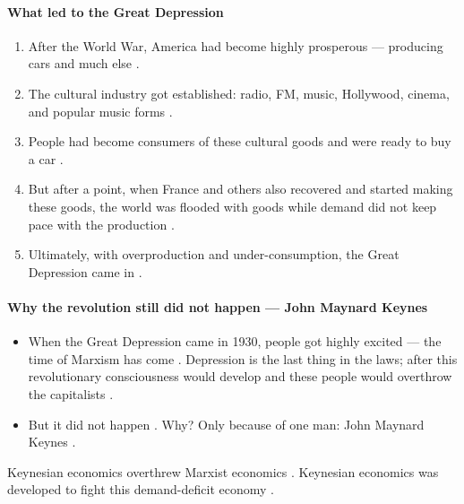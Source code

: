 \paragraph{What led to the Great Depression}
\begin{enumerate}
    \item After the World War, America had become highly prosperous --- producing cars and much else .
    \item The cultural industry got established: radio, FM, music, Hollywood, cinema, and popular music forms .
    \item People had become consumers of these cultural goods and were ready to buy a car .
    \item But after a point, when France and others also recovered and started making these goods, the world was flooded with goods while demand did not keep pace with the production .
    \item Ultimately, with overproduction and under-consumption, the Great Depression came in .
\end{enumerate}

\paragraph{Why the revolution still did not happen --- John Maynard Keynes}
\begin{itemize}
    \item When the Great Depression came in 1930, people got highly excited --- the time of Marxism has come . Depression is the last thing in the laws; after this revolutionary consciousness would develop and these people would overthrow the capitalists .
    \item But it did not happen . Why? Only because of one man: John Maynard Keynes .
\end{itemize}

\begin{KeyConcept}
Keynesian economics overthrew Marxist economics . Keynesian economics was developed to fight this demand-deficit economy .
\end{KeyConcept}

